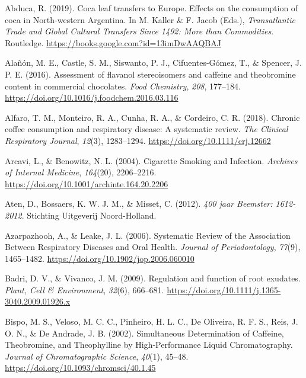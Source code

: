 \documentclass[
]{article}
\newlength{\cslhangindent}
\newlength{\cslentryspacingunit} %
\newenvironment{CSLReferences}[2] %
 {%
  \setlength{\parindent}{0pt}
  \ifodd #1
  \let\oldpar\par
  \def\par{\hangindent=\cslhangindent\oldpar}
  \fi
  \setlength{\parskip}{#2\cslentryspacingunit}
 }%
 {}
\begin{document}
\hypertarget{refs}{}
\begin{CSLReferences}{1}{0}
\leavevmode{}%
Abduca, R. (2019). Coca leaf transfers to {Europe}. {Effects} on the
consumption of coca in {North-western Argentina}. In M. Kaller \& F.
Jacob (Eds.), \emph{Transatlantic {Trade} and {Global Cultural Transfers
Since} 1492: {More} than {Commodities}}. {Routledge}.
\url{https://books.google.com?id=13imDwAAQBAJ}

\leavevmode{}%
Alañón, M. E., Castle, S. M., Siswanto, P. J., Cifuentes-Gómez, T., \&
Spencer, J. P. E. (2016). Assessment of flavanol stereoisomers and
caffeine and theobromine content in commercial chocolates. \emph{Food
Chemistry}, \emph{208}, 177--184.
\url{https://doi.org/10.1016/j.foodchem.2016.03.116}

\leavevmode{}%
Alfaro, T. M., Monteiro, R. A., Cunha, R. A., \& Cordeiro, C. R. (2018).
Chronic coffee consumption and respiratory disease: {A} systematic
review. \emph{The Clinical Respiratory Journal}, \emph{12}(3),
1283--1294. \url{https://doi.org/10.1111/crj.12662}

\leavevmode{}%
Arcavi, L., \& Benowitz, N. L. (2004). Cigarette {Smoking} and
{Infection}. \emph{Archives of Internal Medicine}, \emph{164}(20),
2206--2216. \url{https://doi.org/10.1001/archinte.164.20.2206}

\leavevmode{}%
Aten, D., Bossaers, K. W. J. M., \& Misset, C. (2012). \emph{400 jaar
Beemster: 1612-2012}. {Stichting Uitgeverij Noord-Holland}.

\leavevmode{}%
Azarpazhooh, A., \& Leake, J. L. (2006). Systematic {Review} of the
{Association Between Respiratory Diseases} and {Oral Health}.
\emph{Journal of Periodontology}, \emph{77}(9), 1465--1482.
\url{https://doi.org/10.1902/jop.2006.060010}

\leavevmode{}%
Badri, D. V., \& Vivanco, J. M. (2009). Regulation and function of root
exudates. \emph{Plant, Cell \& Environment}, \emph{32}(6), 666--681.
\url{https://doi.org/10.1111/j.1365-3040.2009.01926.x}

\leavevmode{}%
Bispo, M. S., Veloso, M. C. C., Pinheiro, H. L. C., De Oliveira, R. F.
S., Reis, J. O. N., \& De Andrade, J. B. (2002). Simultaneous
{Determination} of {Caffeine}, {Theobromine}, and {Theophylline} by
{High-Performance Liquid Chromatography}. \emph{Journal of
Chromatographic Science}, \emph{40}(1), 45--48.
\url{https://doi.org/10.1093/chromsci/40.1.45}


\end{CSLReferences}
\end{document}
